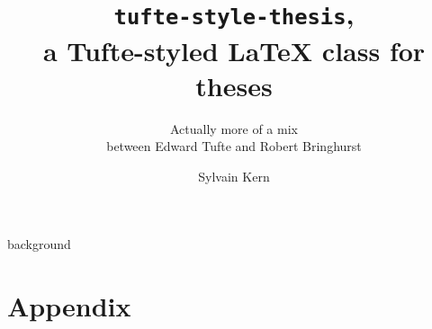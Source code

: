 \documentclass[
    10pt,
	colorful,
	boxey,
 a4paper
]{tufte-style-thesis}
\author{Sylvain Kern}
\title{\texttt{tufte-style-thesis},\\a Tufte-styled \LaTeX{} class for theses}
\subtitle{Actually more of a mix\\between Edward Tufte and Robert Bringhurst}
\begin{document}
\ifdebug
    \layout
\fi


\frontmatter

%
%
%


\mainmatter

{background}
\backmatter

\thispagestyle{empty}
\printbibliography
\cleardoublepage

\part*{Appendix}

\setcounter{table}{0}
\setcounter{figure}{0}

\renewcommand{\thetable}{A\arabic{table}}  %
\renewcommand{\thefigure}{A\arabic{figure}}  %

\cleardoublepage


\begin{wide}
\thispagestyle{empty}
\printindex
\end{wide}
\end{document}
